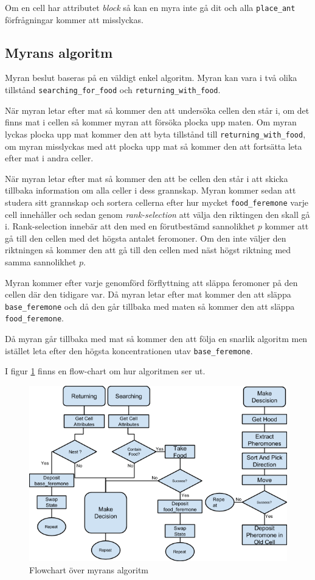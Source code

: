 Om en cell har attributet  \emph{block} så kan en myra inte gå dit och alla \verb+place_ant+ förfrågningar kommer att misslyckas.

\subsection{Myrans algoritm}

Myran beslut baseras på en väldigt enkel algoritm. Myran kan vara i två olika tillstånd \verb+searching_for_food+ och \verb+returning_with_food+. 

När myran letar efter mat så kommer den att undersöka cellen den står i, om det finns mat i cellen så kommer myran att försöka plocka upp maten. Om myran lyckas plocka upp mat kommer den att byta tillstånd till \verb+returning_with_food+, om myran misslyckas med att plocka upp mat så kommer den att fortsätta leta efter mat i andra celler.

När myran letar efter mat så kommer den att be cellen den står i att skicka tillbaka information om alla celler i dess grannskap. Myran kommer sedan att studera sitt grannskap och sortera cellerna efter hur mycket \verb+food_feremone+ varje cell innehåller och sedan genom \emph{rank-selection} att välja den riktingen den skall gå i. Rank-selection innebär att den med en förutbestämd sannolikhet $p$ kommer att gå till den cellen med det högsta antalet feromoner. Om den inte väljer den riktningen så kommer den att gå till den cellen med näst högst riktning med samma sannolikhet $p$.

Myran kommer efter varje genomförd förflyttning att släppa feromoner på den cellen där den tidigare var. Då myran letar efter mat kommer den att släppa \verb+base_feremone+ och då den går tillbaka med maten så kommer den att släppa \verb+food_feremone+.

Då myran går tillbaka med mat så kommer den att följa en snarlik algoritm men istället leta efter den högsta koncentrationen utav \verb+base_feremone+.

I figur \ref{fig:myralgo} finns en flow-chart om hur algoritmen ser ut.


\begin{figure}
\includegraphics[scale=0.6]{Figures/myralgo.png}
\caption{Flowchart över myrans algoritm}
\label{fig:myralgo}
\end{figure}

